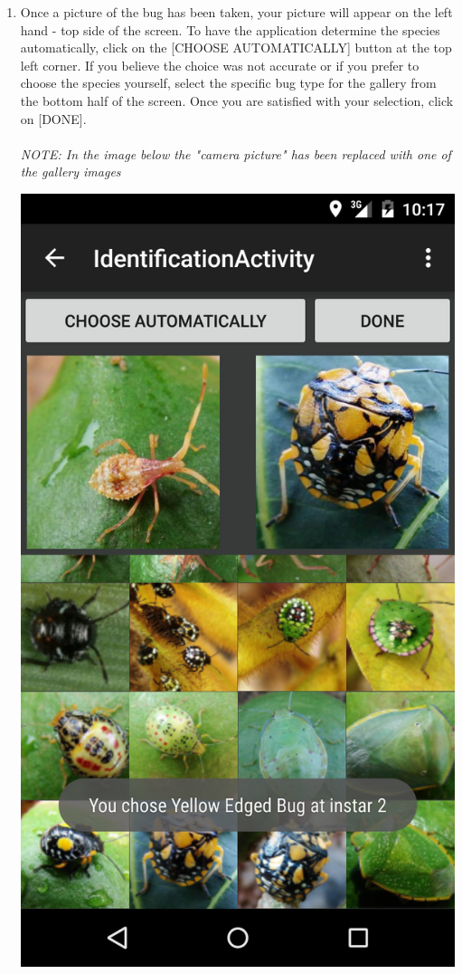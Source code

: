 \documentclass[11pt,a4paper,titlepage]{article}
\begin{document}
\begin{enumerate}
	\item Once a picture of the bug has been taken, your picture will appear on the left hand - top side of the screen. To have the application determine the species automatically, click on the [CHOOSE AUTOMATICALLY] button at the top left corner. If you believe the choice was not accurate or if you prefer to choose the species yourself, select the specific bug type for the gallery from the bottom half of the screen. Once you are satisfied with your selection, click on [DONE].\\
\hfill\\
\textit{NOTE: In the image below the "camera picture" has been replaced with one of the gallery images}
	\begin{center}
				\includegraphics[scale=0.13]{shot4}
			\end{center}


\end{enumerate}
\end{document}
